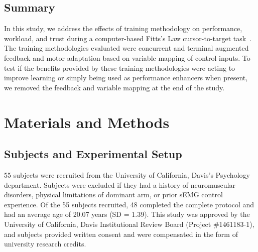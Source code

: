 \subsection{Summary}

In this study, we address the effects of training methodology on performance, workload, and trust during a computer-based Fitts's Law cursor-to-target task~\citep{RN43}.
The training methodologies evaluated were concurrent and terminal augmented feedback and motor adaptation based on variable mapping of control inputs.
To test if the benefits provided by these training methodologies were acting to improve learning or simply being used as performance enhancers when present, we removed the feedback and variable mapping at the end of the study.

\section{Materials and Methods}
\subsection{Subjects and Experimental Setup}

55 subjects were recruited from the University of California, Davis's Psychology department.
Subjects were excluded if they had a history of neuromuscular disorders, physical limitations of dominant arm, or prior sEMG control experience.
Of the 55 subjects recruited, 48 completed the complete protocol and had an average age of 20.07 years (SD = 1.39).
This study was approved by the University of California, Davis Institutional Review Board (Project \#1461183-1), and subjects provided written consent and were compensated in the form of university research credits.

